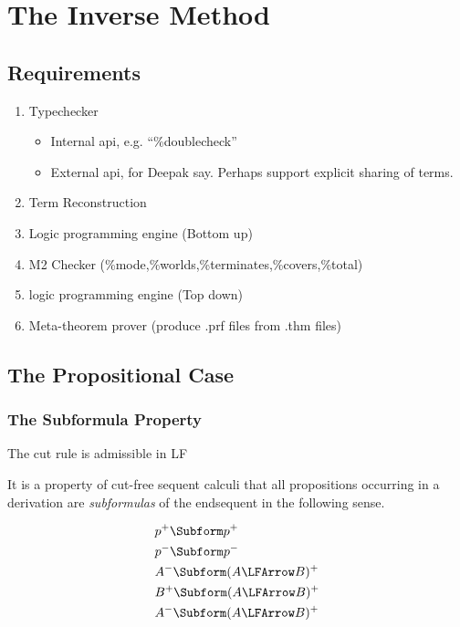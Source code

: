 
\section{The Inverse Method}

\subsection{Requirements}

\begin{enumerate} 
\item Typechecker
  \begin{itemize} 
  \item Internal api, e.g. ``\%doublecheck''
  \item External api, for Deepak say.  Perhaps support explicit sharing of terms.
  \end{itemize} 
\item Term Reconstruction
\item Logic programming engine (Bottom up)
\item M2 Checker (\%mode,\%worlds,\%terminates,\%covers,\%total)
\item logic programming engine (Top down)
\item Meta-theorem prover (produce .prf files from .thm files)
\end{enumerate} 

\subsection{The Propositional Case}

\subsubsection{The Subformula Property}

\begin{Theorem} The cut rule is admissible in LF \end{Theorem} 

It is a property of cut-free sequent calculi that all propositions occurring
in a derivation are \emph{subformulas} of the endsequent in the following sense.

\begin{align*} 
  &p^+ \Subform p^+\\
  &p^- \Subform p^-\\
  &A^- \Subform (A \LFArrow B)^+\\
  &B^+ \Subform (A \LFArrow B)^+\\
  &A^- \Subform (A \LFArrow B)^+\\
\end{align*} 

